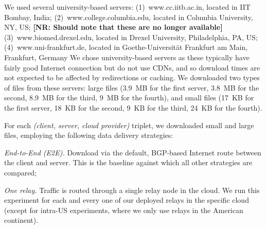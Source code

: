 \documentclass[10pt,sigconf]{acmart}
\newcommand{\mycomm}[3]{{\color{#2} \textbf{[#1: #3]}}}
\newcommand{\mycomm}[3]{}
\newcommand{\IK}[1]{\mycomm{IK}{blue}{#1}}
\newcommand{\AB}[1]{\mycomm{AB}{orange}{#1}}
\newcommand{\NR}[1]{\mycomm{NR}{violet}{#1}}
\def\compactify{\itemsep=0pt \topsep=0pt \partopsep=0pt \parsep=0pt}
\let\latexusecounter=\usecounter
\newenvironment{CompactEnumerate}
    {\def\usecounter{\compactify\latexusecounter}
     \begin{enumerate}}
    {\end{enumerate}\let\usecounter=\latexusecounter}
\newcommand{\PST}[1]{\smallskip\noindent\textit{#1}} %
\begin{document}
\smallskip{} We used several university-based servers: 
(1)~www.cc.iitb.ac.in, located in IIT Bombay, India; (2)~www.college.columbia.edu, located in Columbia University, NY, US;
\NR{Should note that these are no longer available}
(3)~www.biomed.drexel.edu, located in Drexel University, Philadelphia, PA, US;
(4)~www.uni-frankfurt.de, located in Goethe-Universität Frankfurt am Main, Frankfurt, Germany
We chose university-based servers as these typically have fairly good Internet connection but do not use CDNs, and so download times are not expected to be affected by redirections or caching. We downloaded two types of files from these servers: large files (3.9~MB for the first server, 3.8~MB for the second, 8.9~MB for the third, 9~MB for the fourth), and small files (17~KB for the first server, 18~KB for the second, 9~KB for the third, 24~KB for the fourth).


\smallskip{} For each \textit{(client, server, cloud provider)} triplet, we downloaded small and large files, employing the following data delivery strategies:

\PST{End-to-End (E2E).} Download via the default, BGP-based Internet route between the client and server. This is the baseline against which all other strategies are compared;

\PST{One relay.} Traffic is routed through a single relay node in the cloud. We run this experiment for each and every one of our deployed relays in the specific cloud (except for intra-US experiments, where we only use relays in the American continent).
\end{document}
